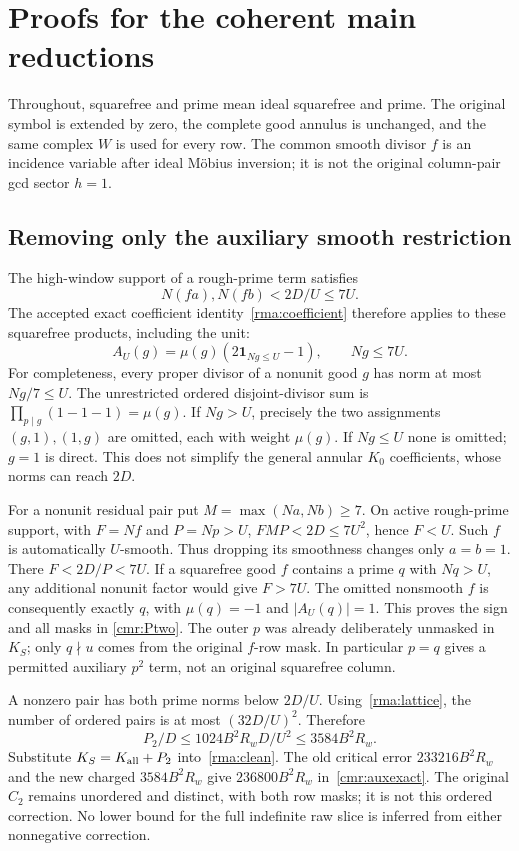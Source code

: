 \section{Proofs for the coherent main reductions}\label{cmr:details}
Throughout, squarefree and prime mean ideal squarefree and prime.
The original symbol is extended by zero, the complete good annulus is
unchanged, and the same complex $W$ is used for every row. The common
smooth divisor $f$ is an incidence variable after ideal M\"obius
inversion; it is not the original column-pair gcd sector $h=1$.

\subsection{Removing only the auxiliary smooth restriction}
The high-window support of a rough-prime term satisfies
\[
 N(fa),N(fb)<2D/U\le7U.
\]
The accepted exact coefficient identity~\eqref{rma:coefficient} therefore
applies to these squarefree products, including the unit:
\begin{equation}\label{cmr:short-coefficient}
 A_U(g)=\mu(g)(2\mathbf1_{Ng\le U}-1),\qquad Ng\le7U.
\end{equation}
For completeness, every proper divisor of a nonunit good $g$ has norm
at most $Ng/7\le U$. The unrestricted ordered disjoint-divisor sum is
$\prod_{p\mid g}(1-1-1)=\mu(g)$. If $Ng>U$, precisely the two
assignments $(g,1),(1,g)$ are omitted, each with weight $\mu(g)$.
If $Ng\le U$ none is omitted; $g=1$ is direct. This does not simplify
the general annular $K_0$ coefficients, whose norms can reach $2D$.

For a nonunit residual pair put $M=\max(Na,Nb)\ge7$.
On active rough-prime support, with $F=Nf$ and $P=Np>U$,
$FMP<2D\le7U^2$, hence $F<U$. Such $f$ is automatically $U$-smooth.
Thus dropping its smoothness changes only $a=b=1$.
There $F<2D/P<7U$. If a squarefree good $f$ contains a prime $q$
with $Nq>U$, any additional nonunit factor would give $F>7U$.
The omitted nonsmooth $f$ is consequently exactly $q$, with
$\mu(q)=-1$ and $|A_U(q)|=1$. This proves the sign and all masks in
\eqref{cmr:Ptwo}. The outer $p$ was already deliberately unmasked in
$K_S$; only $q\nmid u$ comes from the original $f$-row mask.
In particular $p=q$ gives a permitted auxiliary $p^2$ term, not an
original squarefree column.

A nonzero pair has both prime norms below $2D/U$.
Using~\eqref{rma:lattice}, the number of ordered pairs is at most
$(32D/U)^2$. Therefore
\[
 P_2/D\le1024B^2R_w D/U^2\le3584B^2R_w.
\]
Substitute $K_S=K_{\rm all}+P_2$ into~\eqref{rma:clean}.
The old critical error $233216B^2R_w$ and the new charged
$3584B^2R_w$ give $236800B^2R_w$ in~\eqref{cmr:auxexact}.
The original $C_2$ remains unordered and distinct, with both row
masks; it is not this ordered correction. No lower bound for the full
indefinite raw slice is inferred from either nonnegative correction.

